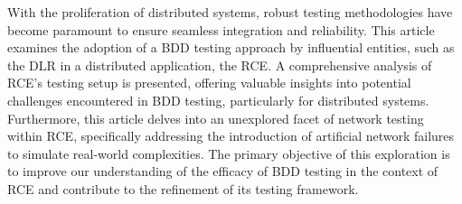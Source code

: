 With the proliferation of distributed systems, robust testing methodologies have become paramount to ensure seamless integration and reliability. This article examines the adoption of a \ac{BDD} testing approach by influential entities, such as the \ac{DLR} in a distributed application, the \ac{RCE}. A comprehensive analysis of \ac{RCE}'s testing setup is presented, offering valuable insights into potential challenges encountered in \ac{BDD} testing, particularly for distributed systems. Furthermore, this article delves into an unexplored facet of network testing within \ac{RCE}, specifically addressing the introduction of artificial network failures to simulate real-world complexities. The primary objective of this exploration is to improve our understanding of the efficacy of \ac{BDD} testing in the context of \ac{RCE} and contribute to the refinement of its testing framework.
